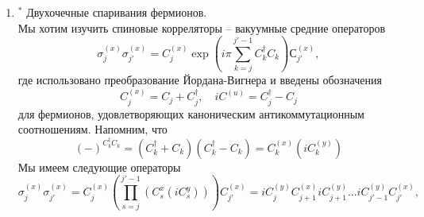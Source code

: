 \documentclass[12pt]{article}
\theoremstyle{definition}
\begin{document}
\begin{enumerate}
\begin{itemize}
\begin{multline}
\begin{pmatrix}
                -\cos k &\sin k\\
                \sin k & \cos k
            \end{pmatrix}\right)=\begin{pmatrix}
                \frac{\sin k}{\cos k+1} & \frac{\sin k}{\cos k-1}\\
                1 & 1
            \end{pmatrix}\begin{pmatrix}
                e^{2K} & 0\\
                0 & e^{-2K}
            \end{pmatrix}\begin{pmatrix}
                \frac{1-\cos2k}{4\sin k} & \frac{1+\cos k}{2}\\
                \frac{\cos2k-1}{4\sin k} & \frac{1-\cos k}{2}
            \end{pmatrix}=\\=\begin{pmatrix}
                \cosh 2K-\sinh2K\cos k & \sinh2K\sin k\\
                \sinh2K\sin k & \cosh 2K+\sinh2K\cos k
            \end{pmatrix}
        \end{multline}
    \end{itemize}
    \item $^*$ Двухочечные спаривания фермионов.\\
    Мы хотим изучить спиновые корреляторы -- вакуумные средние операторов
    \begin{equation}
        \sigma^{(x)}_j\sigma^{(x)}_{j'}=C^{(x)}_j\exp\left(i\pi\sum\limits_{k=j}^{j'-1}C^\dagger_kC_k\right)С^{(x)}_{j'},
    \end{equation}
    где использовано преобразование Йордана-Вигнера и введены обозначения
    \begin{equation}
        C^{(x)}_j=C_j+C^\dagger_j,\quad iC^{(u)}=C^\dagger_j-C_j
    \end{equation}
    для фермионов, удовлетворяющих каноническим антикоммутационным соотношениям. Напомним, что
    \begin{equation}
        (-)^{C^\dagger_kC_k}=(C_k^\dagger+C_k)(C_k^\dagger-C_k)=C^{(x)}_k(iC^{(y)}_k)
    \end{equation}
    Мы имеем следующие операторы
    \begin{equation}
        \sigma^{(x)}_j\sigma^{(x)}_{j'}=C^{(x)}_j\left(\prod\limits_{s=j}^{j'-1}(C^{x}_s(iC^{y}_s))\right)C^{(x)}_{j'}=iC^{(y)}_jC^{(x)}_{j+1}iC^{(y)}_{j+1}...iC^{(y)}_{j'-1}C^{(x)}_{j'},

\end{equation}
\end{enumerate}
\end{document}
